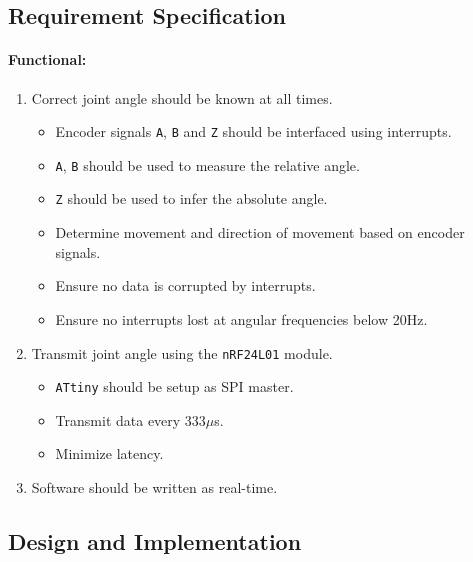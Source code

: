 \subsection{Requirement Specification} 

\paragraph{Functional:}
\begin{enumerate}[resume]
	\item Correct joint angle should be known at all times.
	\label{enum:joint_correct_angles}
	\begin{itemize}
		\item Encoder signals \texttt{A}, \texttt{B} and \texttt{Z} should be interfaced using interrupts.
		\item \texttt{A}, \texttt{B} should be used to measure the relative angle.
		\item \texttt{Z} should be used to infer the absolute angle. 
		\item Determine movement and direction of movement based on encoder signals.
		\item Ensure no data is corrupted by interrupts.
		\item Ensure no interrupts lost at angular frequencies below 20Hz.
	\end{itemize}
	\item Transmit joint angle using the \texttt{nRF24L01} module.
	\label{enum:joint_transmit}
	\begin{itemize}
		\item \texttt{ATtiny} should be setup as SPI master.
		\item Transmit data every 333$\mu$s.
		\item Minimize latency.
	\end{itemize}
	\item Software should be written as real-time.
	\label{enum:joint_real_time}
\end{enumerate}

\subsection{Design and Implementation} %
\label{sub:design_and_implementation}

